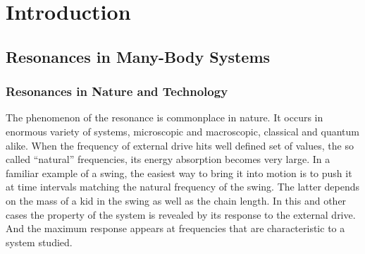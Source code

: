 ﻿\titleformat{\chapter}[display]   
{\normalfont\large\bfseries\centering}{\chaptertitlename\ \thechapter}{10pt}{\large}   
\titlespacing*{\chapter}{0pt}{-20pt}{25pt}
\chapter{Introduction}
\label{intro}
\section{Resonances in Many-Body Systems}
\subsection{Resonances in Nature and Technology}
The phenomenon of the resonance is commonplace in nature.
It occurs in enormous variety of systems, microscopic and macroscopic, classical and quantum alike.  
When the frequency of external drive hits well defined set of values, the so called ``natural'' frequencies, its energy absorption becomes very large.
In a familiar example of a swing,  the easiest way to bring it into motion is to push it at time intervals matching the natural frequency of the swing.
The latter depends on the mass of a kid in the swing as well as the chain length.
In this and other cases the property of the system is revealed by its response to the external drive.
And the maximum response appears at frequencies that are characteristic to a system studied.
  

